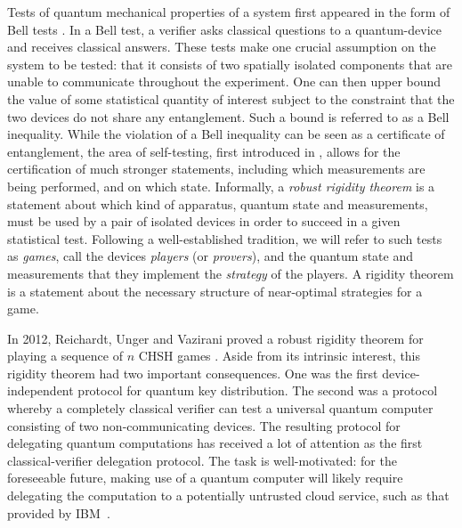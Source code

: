 \documentclass[11pt]{article}
\numberwithin{equation}{section}
\theoremstyle{definition}
\theoremstyle{plain}
\begin{document}
Tests of quantum mechanical properties of a system first appeared in the form of Bell tests \cite{Bell:64a,Clauser:69a}. In a Bell test, a verifier asks classical questions to a quantum-device and receives classical answers. These tests make one crucial assumption on the system to be tested: that it consists of two spatially isolated components that are unable to communicate throughout the experiment. One can then upper bound the value of some statistical quantity of interest subject to the constraint that the two devices do not share any entanglement. Such a bound is referred to as a Bell inequality. While the violation of a Bell inequality can be seen as a certificate of entanglement, the area of self-testing, first introduced in \cite{mayers2004selftesting}, allows for the certification of much stronger statements, including  which measurements are being performed, and on which state.  Informally, a \emph{robust rigidity theorem} is a statement about which kind of apparatus, quantum state and measurements, must be used by a pair of isolated devices in order to succeed in a given statistical test. Following a well-established tradition, we will refer to such tests as \emph{games}, call the devices \emph{players} (or \emph{provers}), and the quantum state and measurements that they implement the \emph{strategy} of the players. A rigidity theorem is a statement about the necessary structure of near-optimal strategies for a game.  

In 2012, Reichardt, Unger and Vazirani proved a robust rigidity theorem for
playing a sequence of $n$ CHSH games \cite{reichardt2012classical}. Aside from
its intrinsic interest, this rigidity theorem had two important consequences.
One was the first device-independent protocol for quantum key distribution. The
second was a protocol whereby a completely classical verifier can test a
universal quantum computer consisting of two non-communicating devices.  The resulting
 protocol for delegating quantum
computations has received a lot of attention as the first classical-verifier delegation protocol. 
The task is well-motivated: for the foreseeable future, making use of a quantum computer will likely require delegating the computation to a potentially untrusted cloud service, such as that provided by IBM~\cite{ibmcloud}.  
\end{document}
